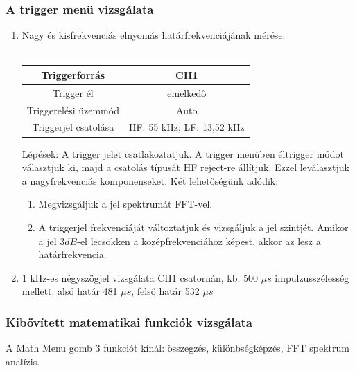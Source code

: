 \documentclass[10pt,a4paper]{article}
\begin{document}
			\subsubsection{A trigger menü vizsgálata}
			\begin{enumerate}
				\item Nagy és kisfrekvenciás elnyomás határfrekvenciájának mérése.\\\\\begin{tabular}{|c|c|}
				\hline 
				Triggerforrás & CH1 \\ 
				\hline 
				Trigger él & emelkedő \\ 
				\hline 
				Triggerelési üzemmód & Auto \\ 
				\hline 
				Triggerjel csatolása & HF: 55 kHz; LF: 13,52 kHz \\ 
				\hline 
				\end{tabular}$$$$
				Lépések: A trigger jelet csatlakoztatjuk. A trigger menüben éltrigger módot választjuk ki, majd a csatolás típusát HF reject-re állítjuk. Ezzel leválasztjuk a nagyfrekvenciás komponenseket. Két lehetőségünk adódik:
				\begin{enumerate}
					\item Megvizsgáljuk a jel spektrumát FFT-vel.
					\item A triggerjel frekvenciáját változtatjuk és vizsgáljuk a jel szintjét. Amikor a jel $3 dB$-el lecsökken a középfrekvenciához képest, akkor az lesz a határfrekvencia.
					
				\end{enumerate}				   
				\item 1 kHz-es négyszögjel vizsgálata CH1 csatornán, kb. 500 $\mu s$ impulzusszélesség mellett: alsó határ 481 $\mu s$, felső határ 532 $\mu s$
			\end{enumerate}
			\subsubsection{Kibővített matematikai funkciók vizsgálata}
			A Math Menu gomb 3 funkciót kínál: összegzés, különbségképzés, FFT spektrum analízis.
\end{document}
